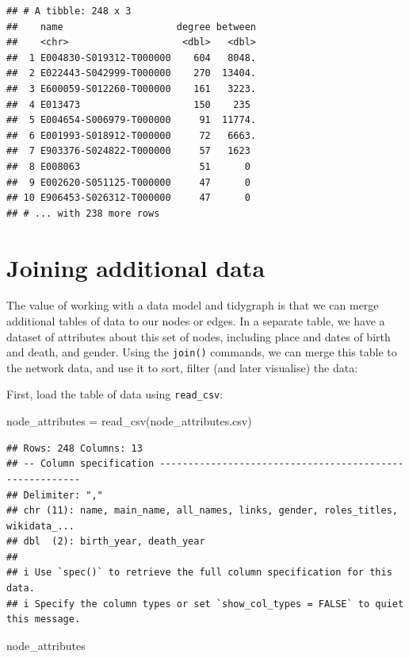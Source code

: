\documentclass[
]{book}
\newenvironment{Shaded}{\begin{snugshade}}{\end{snugshade}}
\newcommand{\FunctionTok}[1]{\textcolor[rgb]{0.00,0.00,0.00}{#1}}
\newcommand{\NormalTok}[1]{#1}
\newcommand{\OtherTok}[1]{\textcolor[rgb]{0.56,0.35,0.01}{#1}}
\newcommand{\StringTok}[1]{\textcolor[rgb]{0.31,0.60,0.02}{#1}}
\begin{document}
\begin{verbatim}
## # A tibble: 248 x 3
##    name                    degree between
##    <chr>                    <dbl>   <dbl>
##  1 E004830-S019312-T000000    604   8048.
##  2 E022443-S042999-T000000    270  13404.
##  3 E600059-S012260-T000000    161   3223.
##  4 E013473                    150    235 
##  5 E004654-S006979-T000000     91  11774.
##  6 E001993-S018912-T000000     72   6663.
##  7 E903376-S024822-T000000     57   1623 
##  8 E008063                     51      0 
##  9 E002620-S051125-T000000     47      0 
## 10 E906453-S026312-T000000     47      0 
## # ... with 238 more rows
\end{verbatim}

\hypertarget{joining-additional-data}{%
\section{Joining additional data}\label{joining-additional-data}}

The value of working with a data model and tidygraph is that we can merge additional tables of data to our nodes or edges. In a separate table, we have a dataset of attributes about this set of nodes, including place and dates of birth and death, and gender. Using the \texttt{join()} commands, we can merge this table to the network data, and use it to sort, filter (and later visualise) the data:

First, load the table of data using \texttt{read\_csv}:

\begin{Shaded}
\begin{Highlighting}[]
\NormalTok{node\_attributes }\OtherTok{=} \FunctionTok{read\_csv}\NormalTok{(}\StringTok{\textquotesingle{}node\_attributes.csv\textquotesingle{}}\NormalTok{)}
\end{Highlighting}
\end{Shaded}

\begin{verbatim}
## Rows: 248 Columns: 13
## -- Column specification --------------------------------------------------------
## Delimiter: ","
## chr (11): name, main_name, all_names, links, gender, roles_titles, wikidata_...
## dbl  (2): birth_year, death_year
## 
## i Use `spec()` to retrieve the full column specification for this data.
## i Specify the column types or set `show_col_types = FALSE` to quiet this message.
\end{verbatim}

\begin{Shaded}
\begin{Highlighting}[]
\NormalTok{node\_attributes}
\end{Highlighting}
\end{Shaded}
\end{document}
